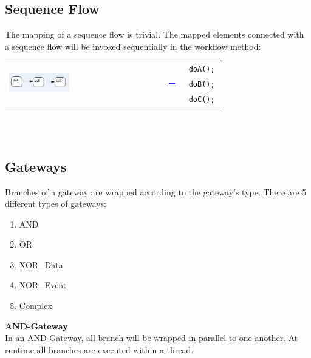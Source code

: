 \subsection{Sequence Flow}
The mapping of a sequence flow is trivial. The mapped elements connected with a sequence flow will be invoked sequentially in the workflow method:

\begin{tabularx}{\linewidth}{lcX}
	\multirow{3}{*}{\includegraphics[width=0.4\textwidth]{images/mapping/sequence.png}} &  &	\texttt{	doA();}\\
	& \textbf{\textcolor{blue}{=}}& \texttt{	doB();}\\
	& & \texttt{	doC();}\\
\end{tabularx}\\\\

\subsection{Gateways}
Branches of a gateway are wrapped according to the gateway's type. There are 5 different types of gateways:
\begin{enumerate}
	\item AND 
	\item OR 
	\item XOR\_Data 
	\item XOR\_Event 
	\item Complex 
\end{enumerate}

\textbf{AND-Gateway}\\
In an AND-Gateway, all branch will be wrapped in parallel to one another. At runtime all branches are executed within a thread. 

